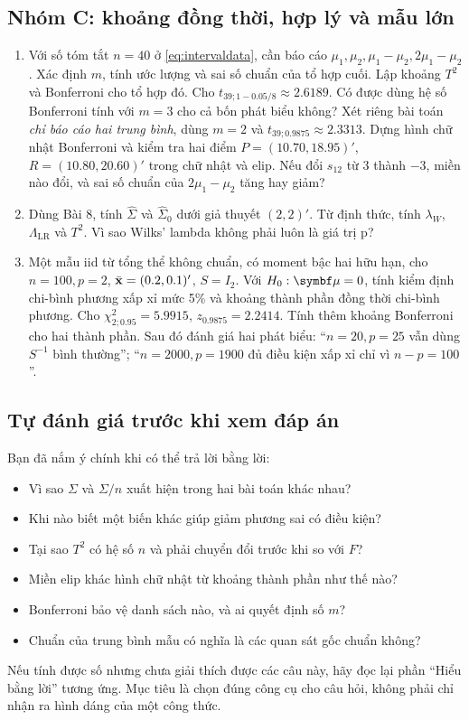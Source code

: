 \subsection{Nhóm C: khoảng đồng thời, hợp lý và mẫu lớn}
\begin{enumerate}[label=\textbf{Bài \arabic*.},ref=\arabic*,resume=practice]
\item Với số tóm tắt $n=40$ ở \eqref{eq:intervaldata}, cần báo cáo
$\mu_1,\mu_2,\mu_1-\mu_2,2\mu_1-\mu_2$.
Xác định $m$, tính ước lượng và sai số chuẩn của tổ hợp cuối.
Lập khoảng $T^2$ và Bonferroni cho tổ hợp đó.
Cho $t_{39;1-0.05/8}\approx2.6189$.
Có được dùng hệ số Bonferroni tính với $m=3$ cho cả bốn phát biểu không?
Xét riêng bài toán \emph{chỉ báo cáo hai trung bình}, dùng $m=2$ và
$t_{39;0.9875}\approx2.3313$. Dựng hình chữ nhật Bonferroni và kiểm tra
hai điểm $P=(10.70,18.95)'$, $R=(10.80,20.60)'$ trong chữ nhật và elip.
Nếu đổi $s_{12}$ từ 3 thành $-3$, miền nào đổi, và sai số chuẩn của
$2\mu_1-\mu_2$ tăng hay giảm?

\item Dùng Bài 8, tính $\widehat\Sigma$ và
$\widehat\Sigma_0$ dưới giả thuyết $(2,2)'$.
Từ định thức, tính $\lambda_W$, $\Lambda_{\mathrm{LR}}$ và $T^2$.
Vì sao Wilks' lambda không phải luôn là giá trị p?

\item Một mẫu iid từ tổng thể không chuẩn, có moment bậc hai hữu hạn,
cho $n=100,p=2$, $\bar{\mathbf x}=(0.2,0.1)'$, $S=I_2$.
Với $H_0:\vmu=0$, tính kiểm định chi-bình phương xấp xỉ mức 5\% và
khoảng thành phần đồng thời chi-bình phương. Cho
$\chi^2_{2;0.95}=5.9915$, $z_{0.9875}=2.2414$.
Tính thêm khoảng Bonferroni cho hai thành phần.
Sau đó đánh giá hai phát biểu: ``$n=20,p=25$ vẫn dùng $S^{-1}$ bình thường'';
``$n=2000,p=1900$ đủ điều kiện xấp xỉ chỉ vì $n-p=100$''.
\end{enumerate}

\subsection{Tự đánh giá trước khi xem đáp án}
Bạn đã nắm ý chính khi có thể trả lời bằng lời:
\begin{itemize}
 \item Vì sao $\Sigma$ và $\Sigma/n$ xuất hiện trong hai bài toán khác nhau?
 \item Khi nào biết một biến khác giúp giảm phương sai có điều kiện?
 \item Tại sao $T^2$ có hệ số $n$ và phải chuyển đổi trước khi so với $F$?
 \item Miền elip khác hình chữ nhật từ khoảng thành phần như thế nào?
 \item Bonferroni bảo vệ danh sách nào, và ai quyết định số $m$?
 \item Chuẩn của trung bình mẫu có nghĩa là các quan sát gốc chuẩn không?
\end{itemize}
Nếu tính được số nhưng chưa giải thích được các câu này, hãy đọc lại phần
``Hiểu bằng lời'' tương ứng. Mục tiêu là chọn đúng công cụ cho câu hỏi,
không phải chỉ nhận ra hình dáng của một công thức.
